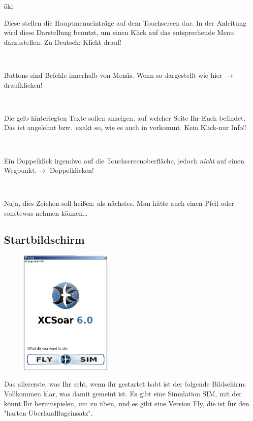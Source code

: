\begin{tabbing}
\quad\=ökl\hfill \kill
{} \> \parbox[c]{11,4cm}{Diese stellen die Hauptmenueinträge auf dem Touchscreen dar. In der Anleitung wird diese Darstellung benutzt, um einen Klick auf das
entsprechende Menu darzustellen. Zu Deutsch: Klickt drauf!}\\[1.2em]
           \>\parbox[c]{11,4cm}{Buttons sind Befehle innerhalb von Menüs.
Wenn so dargestellt wie  hier $\rightarrow$ draufklicken!}\\[1.2em]
  \>\parbox[c]{11,4cm}{Die gelb hinterlegten Texte sollen anzeigen, auf welcher Seite  Ihr Euch befindet. Das ist angelehnt bzw.\ exakt so, wie es auch in  \xc vorkommt. Kein Klick-nur Info!!}\\[1.2em]
\dklick                           \>\parbox[c]{11,4cm}{Ein Doppelklick irgendwo auf die Touchscreenoberfläche, jedoch \textsl{nicht} auf einen Wegpunkt.$\rightarrow$ Doppelklicken!}\\[1.2em]
\qquad\qquad \blink      \>\parbox[c]{11,4cm}{Naja, dies Zeichen soll heißen: als nächstes. Man hätte auch einen Pfeil oder sonstewas nehmen können\dots}
\end{tabbing}
\subsection{Startbildschirm}\label{startbildschirm}
\begin{figure}
\includegraphics[width=4.5cm]{Bilder/ultrafirst.png}
\end{figure}
Das allererste, was Ihr seht, wenn ihr \xc gestartet habt ist der folgende Bildschirm:
Vollkommen klar, was damit gemeint ist. Es gibt eine Simulation \textsf{SIM}, mit der könnt Ihr herumspielen, um zu üben, und es gibt eine Version \textsf{Fly}, die ist für den "harten Überlandflugeinsatz".

